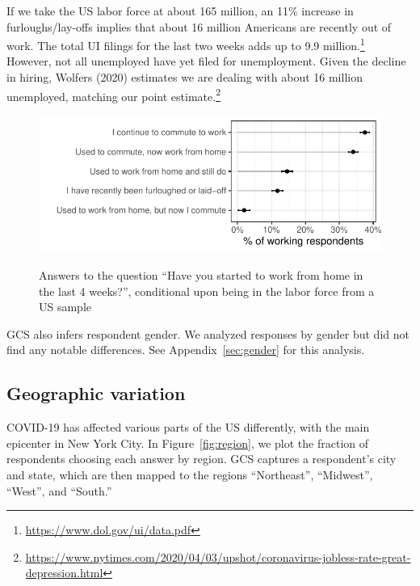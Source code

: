 \documentclass[12pt]{article}
\begin{document}
If we take the US labor force at about 165 million, an 11\% increase in furloughs/lay-offs implies that about 16 million Americans are recently out of work.
The total UI filings for the last two weeks adds up to 9.9 million.\footnote{
  \url{https://www.dol.gov/ui/data.pdf}
}
However, not all unemployed have yet filed for unemployment.
Given the decline in hiring, Wolfers (2020) estimates we are dealing with about 16 million unemployed, matching our point estimate.\footnote{
  \url{https://www.nytimes.com/2020/04/03/upshot/coronavirus-jobless-rate-great-depression.html}
}

\begin{figure}
  \caption{Answers to the question ``Have you started to work from home in the last 4 weeks?'', conditional upon being in the labor force from a US sample} \label{fig:working_summary}
\centering
\begin{minipage}{1.1 \linewidth}
  \includegraphics[width = \linewidth]{plots/working_summary.pdf} \\
  \begin{footnotesize}
    \end{footnotesize}
\end{minipage}
\end{figure} 

GCS also infers respondent gender.
We analyzed responses by gender but did not find any notable differences.
See Appendix~\ref{sec:gender} for this analysis. 

\subsection{Geographic variation} 
COVID-19 has affected various parts of the US differently, with the main epicenter in New York City.
In Figure~\ref{fig:region}, we plot the fraction of respondents choosing each answer by region.
GCS captures a respondent's city and state, which are then mapped to the regions ``Northeast'', ``Midwest'', ``West'', and ``South.'' 
\end{document}
